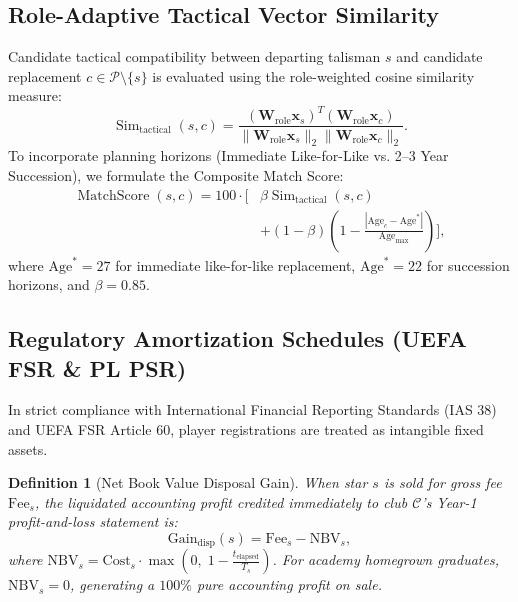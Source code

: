 \documentclass[10pt,journal,compsoc]{IEEEtran}
\newtheorem{definition}{Definition}
\begin{document}
\subsection{Role-Adaptive Tactical Vector Similarity}
Candidate tactical compatibility between departing talisman $s$ and candidate replacement $c \in \mathcal{P} \setminus \{s\}$ is evaluated using the role-weighted cosine similarity measure:
\begin{equation}
\operatorname{Sim}_{\mathrm{tactical}}(s, c) = \frac{(\mathbf{W}_{\mathrm{role}} \mathbf{x}_s)^T (\mathbf{W}_{\mathrm{role}} \mathbf{x}_c)}{\|\mathbf{W}_{\mathrm{role}} \mathbf{x}_s\|_2 \|\mathbf{W}_{\mathrm{role}} \mathbf{x}_c\|_2}.
\end{equation}
To incorporate planning horizons (Immediate Like-for-Like vs. 2–3 Year Succession), we formulate the Composite Match Score:
\begin{equation}
\begin{aligned}
\operatorname{MatchScore}(s, c) = 100 \cdot \Big[ & \beta \operatorname{Sim}_{\mathrm{tactical}}(s, c) \\
& + (1 - \beta) \left(1 - \frac{|\mathrm{Age}_c - \mathrm{Age}^*|}{\mathrm{Age}_{\max}}\right) \Big],
\end{aligned}
\end{equation}
where $\mathrm{Age}^* = 27$ for immediate like-for-like replacement, $\mathrm{Age}^* = 22$ for succession horizons, and $\beta = 0.85$.

\subsection{Regulatory Amortization Schedules (UEFA FSR \& PL PSR)}
In strict compliance with International Financial Reporting Standards (IAS 38) and UEFA FSR Article 60, player registrations are treated as intangible fixed assets.

\begin{definition}[Net Book Value Disposal Gain]
When star $s$ is sold for gross fee $\mathrm{Fee}_s$, the liquidated accounting profit credited immediately to club $\mathcal{C}$'s Year-1 profit-and-loss statement is:
\begin{equation}
\mathrm{Gain}_{\mathrm{disp}}(s) = \mathrm{Fee}_s - \mathrm{NBV}_s,
\end{equation}
where $\mathrm{NBV}_s = \mathrm{Cost}_s \cdot \max\left(0, \; 1 - \frac{t_{\mathrm{elapsed}}}{T_s}\right)$. For academy homegrown graduates, $\mathrm{NBV}_s = 0$, generating a $100\%$ pure accounting profit on sale.
\end{definition}
\end{document}
